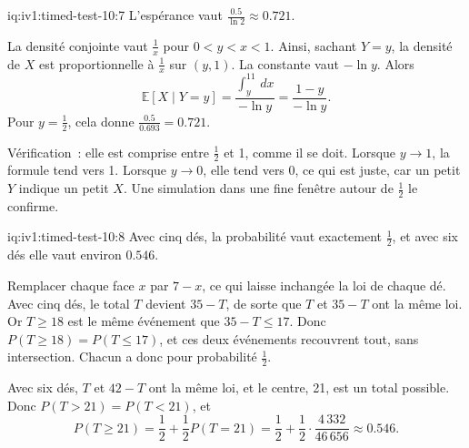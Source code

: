 \begin{solution}{iq:iv1:timed-test-10:7}
L'espérance vaut $\frac{0.5}{\ln 2} \approx 0.721$.

La densité conjointe vaut $\frac1x$ pour $0 < y < x < 1$. Ainsi, sachant $Y = y$, la densité de $X$ est proportionnelle à $\frac1x$ sur $(y, 1)$. La constante vaut $-\ln y$. Alors
\[
\mathbb{E}[X \mid Y = y] = \frac{\int_y^11\,dx}{-\ln y} = \frac{1 - y}{-\ln y}.
\]
Pour $y = \frac12$, cela donne $\frac{0.5}{0.693} = 0.721$.

Vérification~: elle est comprise entre $\frac12$ et 1, comme il se doit. Lorsque $y \to 1$, la formule tend vers 1. Lorsque $y \to 0$, elle tend vers 0, ce qui est juste, car un petit $Y$ indique un petit $X$. Une simulation dans une fine fenêtre autour de $\frac12$ le confirme.

\end{solution}

\begin{solution}{iq:iv1:timed-test-10:8}
Avec cinq dés, la probabilité vaut exactement $\frac12$, et avec six dés elle vaut environ $0.546$.

Remplacer chaque face $x$ par $7 - x$, ce qui laisse inchangée la loi de chaque dé. Avec cinq dés, le total $T$ devient $35 - T$, de sorte que $T$ et $35 - T$ ont la même loi. Or $T \ge 18$ est le même événement que $35 - T \le 17$. Donc $P(T \ge 18) = P(T \le 17)$, et ces deux événements recouvrent tout, sans intersection. Chacun a donc pour probabilité $\frac12$.

Avec six dés, $T$ et $42 - T$ ont la même loi, et le centre, 21, est un total possible. Donc $P(T > 21) = P(T < 21)$, et
\[
P(T \ge 21) = \frac12 + \frac12P(T = 21) = \frac12 + \frac12 \cdot \frac{4\,332}{46\,656} \approx 0.546.
\]

\end{solution}

